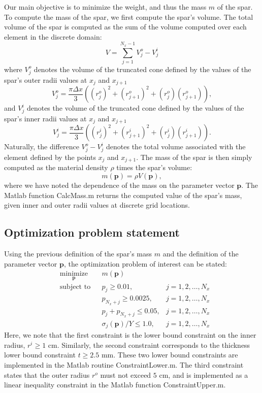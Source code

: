 \documentclass[11pt]{article}
\newcommand{\bs}[1] {\boldsymbol{#1}}
\begin{document}
Our main objective is to minimize the weight, and thus
the mass $m$ of the spar. To compute the mass of the
spar, we first compute the spar's volume. The total volume
of the spar is computed as the sum of the volume computed
over each element in the discrete domain:
\begin{equation}
V = \sum^{N_x-1}_{j=1} V^o_j - V^i_j
\end{equation}
where $V^o_j$ denotes the volume of the truncated cone
defined by the values of the spar's outer
radii values at $x_j$ and $x_{j+1}$
\begin{equation}
V^o_j = \frac{\pi \Delta x}{3} ((r^o_j)^2 + (r^o_{j+1})^2 + (r^o_j)(r^o_{j+1})),
\end{equation}
and $V^i_j$ denotes the volume of the truncated cone
defined by the values of the spar's inner
radii values at $x_j$ and $x_{j+1}$
\begin{equation}
V^i_j = \frac{\pi \Delta x}{3} ((r^i_j)^2 + (r^i_{j+1})^2 + (r^i_j) (r^i_{j+1})).
\end{equation}
Naturally, the difference $V^o_j-V^i_j$ denotes the
total volume associated with the element defined
by the points $x_j$ and $x_{j+1}$.
The mass of the spar is then simply computed
as the material density $\rho$ times the spar's volume:
\begin{equation}
m(\bs{p}) =  \rho V(\bs{p}),
\end{equation}
where we have noted the dependence of the mass on the parameter
vector $\bs{p}$. The Matlab
function CalcMass.m returns the computed value
of the spar's mass, given inner and outer radii
values at discrete grid locations.

\subsection{Optimization problem statement}

Using the previous definition of the spar's mass $m$ and the
definition of the parameter vector $\bs{p}$, the
optimization problem of interest can be stated:
\begin{equation}
\begin{aligned}
& \underset{\bs{p}}{\text{minimize}}
& & m(\bs{p}) \\
& \text{subject to}
& & p_j \geq 0.01,                    &j=1,2,\dots,N_x \\
&&& p_{N_x+j} \geq 0.0025,            &j=1,2,\dots,N_x\\
&&& p_j + p_{N_x +j} \leq 0.05,       &j=1,2,\dots,N_x \\
&&& \sigma_j(\bs{p})/Y \leq 1.0,      &j=1,2,\dots,N_x
\end{aligned}
\end{equation}
Here, we note that the first constraint is the lower bound
constraint on the inner radius, $r^i \geq 1$ cm. Similarly,
the second constraint corresponds to the thickness lower
bound constraint $t \geq 2.5$ mm. These two lower bound
constraints are implemented in the Matlab routine
ConstraintLower.m. The third constraint states that the
outer radius $r^o$ must not exceed $5$ cm, and is implemented
as a linear inequality constraint in the Matlab function
ConstraintUpper.m.
\end{document}
